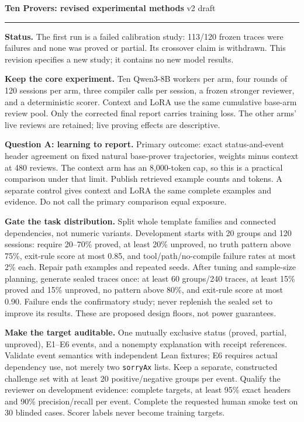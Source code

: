 \documentclass[10pt,letterpaper]{article}
\begin{document}
{\Large\bfseries Ten Provers: revised experimental methods}
\hfill {\small v2 draft}
\vspace{3pt}\hrule

\textbf{Status.} The first run is a failed calibration study: 113/120 frozen
traces were failures and none was proved or partial. Its crossover claim is
withdrawn. This revision specifies a new study; it contains no new model results.

\textbf{Keep the core experiment.} Ten Qwen3-8B workers per arm, four rounds of
120 sessions per arm, three compiler calls per session, a frozen stronger
reviewer, and a deterministic scorer. Context and LoRA use the same cumulative
base-arm review pool. Only the corrected final report carries training loss.
The other arms' live reviews are retained; live proving effects are descriptive.

\textbf{Question A: learning to report.} Primary outcome: exact status-and-event
header agreement on fixed natural base-prover trajectories, weights minus
context at 480 reviews. The context arm has an 8,000-token cap, so this is a
practical comparison under that limit. Publish retrieved example counts and
tokens. A separate control gives context and LoRA the same complete examples
and evidence. Do not call the primary comparison equal exposure.

\textbf{Gate the task distribution.} Split whole template families and connected
dependencies, not numeric variants. Development starts with 20 groups and 120
sessions: require 20--70\% proved, at least 20\% unproved, no truth pattern above
75\%, exit-rule score at most 0.85, and tool/path/no-compile failure rates at most
2\% each. Repair path examples and repeated seeds. After tuning and sample-size
planning, generate sealed traces once: at least 60 groups/240 traces, at least
15\% proved and 15\% unproved, no pattern above 80\%, and exit-rule score at most
0.90. Failure ends the confirmatory study; never replenish the sealed set to
improve its results. These are proposed design floors, not power guarantees.

\textbf{Make the target auditable.} One mutually exclusive status (proved,
partial, unproved), E1--E6 events, and a nonempty explanation with receipt
references. Validate event semantics with independent Lean fixtures; E6 requires
actual dependency use, not merely two \texttt{sorryAx} lists. Keep a separate,
constructed challenge set with at least 20 positive/negative groups per event.
Qualify the reviewer on development evidence: complete targets, at least 95\%
exact headers and 90\% precision/recall per event. Complete the requested human
smoke test on 30 blinded cases. Scorer labels never become training targets.
\end{document}
